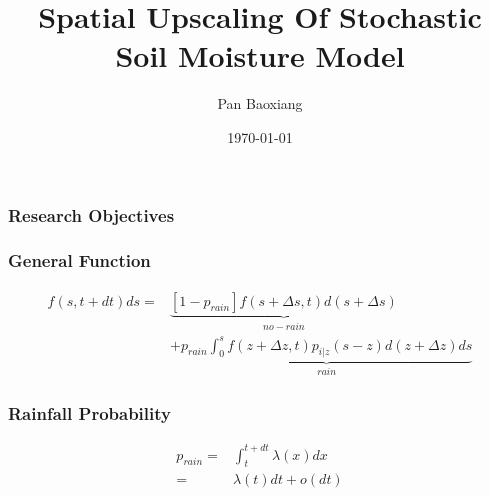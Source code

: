\documentclass{beamer}
\begin{document}
\title{Spatial Upscaling Of Stochastic Soil Moisture Model}
\author{Pan Baoxiang}
\date{\today}
\maketitle

\begin{frame}
\frametitle{Research Objectives}
			
\end{frame}
\begin{frame}
\frametitle{General Function}
\begin{equation}
\begin{split}
f(s,t+dt)ds=&\underbrace{[1-p_{rain}]f(s+\Delta s,t)d(s+\Delta s)}_{no-rain}\\&+\underbrace{p_{rain} \int_{0}^{s} f(z+\Delta z,t)p_{i|z}(s-z)d(z+\Delta z)ds}_{rain}
\end{split}
\end{equation}
\end{frame}

\begin{frame}
\frametitle{Rainfall Probability}
\begin{equation}
\begin{split}
p_{rain}=&\int_t^{t+dt} \lambda(x)dx\\=&\lambda(t)dt+o(dt)
\end{split}
\end{equation}
\end{frame}
\end{document}
